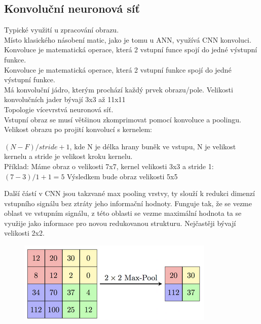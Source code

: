 \subsection{Konvoluční neuronová síť}
Typické využití u zpracování obrazu.\\
Místo klasického násobení matic, jako je tomu u ANN, využívá CNN konvoluci.\\
Konvoluce je matematická operace, která 2 vstupní funce spojí do jedné výstupní funkce.\\
Konvoluce je matematická operace, která 2 vstupní funkce spojí do jedné výstupní funkce.\\
Má konvoluční jádro, kterým prochází každý prvek obrazu/pole. Velikosti konvolučních jader bývají 3x3 až 11x11\\
Topologie vícevrstvá neuronová síť.\\
Vstupní obraz se musí většinou zkomprimovat pomocí konvoluce a poolingu.\\
Velikost obrazu po projití konvolucí s kernelem:
\begin{center}
    \((N-F)/stride +1\), kde N je délka hrany buněk ve vstupu, N je velikost kernelu a stride je velikost kroku kernelu.\\
    Příklad: Máme obraz o velikosti 7x7, kernel velikosti 3x3 a stride 1:\\
    \((7-3)/1+1 = 5\) Výsledkem bude obraz velikosti 5x5
\end{center}
Další částí v CNN jsou takzvané max pooling vrstvy, ty slouží k redukci dimenzí vstupního signálu bez ztráty jeho informační hodnoty. Funguje tak, že se vezme oblast ve vstupním signálu, z této oblasti se vezme maximální hodnota ta se využije jako informace pro novou redukovanou strukturu. Nejčastěji bývají velikosti 2x2.\\
\begin{figure}[h!]
    \centering
    \includegraphics[scale = 0.5]{images/MaxPooling.png}
\end{figure}


